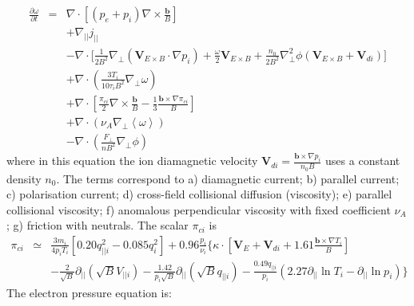 \documentclass[12pt,a4paper]{article}
\begin{document}
\begin{subequations}
\begin{eqnarray}
%
%
  \frac{\partial\omega}{\partial t} &=& \nabla\cdot\left[\left(p_e + p_i\right)\nabla\times\frac{\mathbf{b}}{B}\right] \label{eq:vort_diamag} \\
  && + \nabla_{||}j_{||} \label{eq:vort_jpar} \\
  && - \nabla\cdot\Big[ \frac{1}{2B^2}\nabla_\perp\left(\mathbf{V}_{E\times B}\cdot\nabla p_i\right) + \frac{\omega}{2}\mathbf{V}_{E\times B}  +\frac{n_0}{2B^2}\nabla_\perp^2\phi \left(\mathbf{V}_{E\times B} + \mathbf{V}_{di}\right) \Big] \label{eq:vort_c} \\
  && + \nabla\cdot\left(\frac{3T_i}{10\tau_iB^2}\nabla_\perp\omega\right) \label{eq:vort_perpvis} \\
  && + \nabla\cdot\left[\frac{\pi_{ci}}{2}\nabla\times\frac{\mathbf{b}}{B} - \frac{1}{3}\frac{\mathbf{b}\times\nabla\pi_{ci}}{B}\right] \\
  && + \nabla\cdot\left(\nu_A\nabla_\perp\left<\omega\right>\right) \\
  && - \nabla\cdot\left(\frac{F_\perp}{nB^2}\nabla_\perp\phi\right)
\end{eqnarray}
\end{subequations}
where in this equation the ion diamagnetic velocity $\mathbf{V}_{di} = \frac{\mathbf{b}\times\nabla p_i}{n_0 B}$ uses a constant density $n_0$. The terms correspond to a) diamagnetic current; b) parallel current; c) polarisation current; d) cross-field collisional diffusion (viscosity); e) parallel collisional viscosity; f) anomalous perpendicular viscosity with fixed coefficient $\nu_A$; g) friction with neutrals. The scalar $\pi_{ci}$ is
\begin{eqnarray}
  \pi_{ci} &\simeq& \frac{3m_i}{4p_iT_i}\left[0.20q_{||i}^2 - 0.085q_i^2\right] + 0.96\frac{p_i}{\nu_i}\Bigg\{\kappa\cdot\left[\mathbf{V}_E + \mathbf{V}_{di} + 1.61\frac{\mathbf{b}\times\nabla T_i}{B}\right] \nonumber \\
  && - \frac{2}{\sqrt{B}}\partial_{||}\left(\sqrt{B}V_{||i}\right) - \frac{1.42}{p_i\sqrt{B}}\partial_{||}\left(\sqrt{B}q_{||i}\right) - \frac{0.49q_{||i}}{p_i}\left(2.27\partial_{||}\ln T_i - \partial_{||}\ln p_i\right)\Bigg\} \label{eq:pi_ci}
\end{eqnarray}
The electron pressure equation is:
\end{document}
